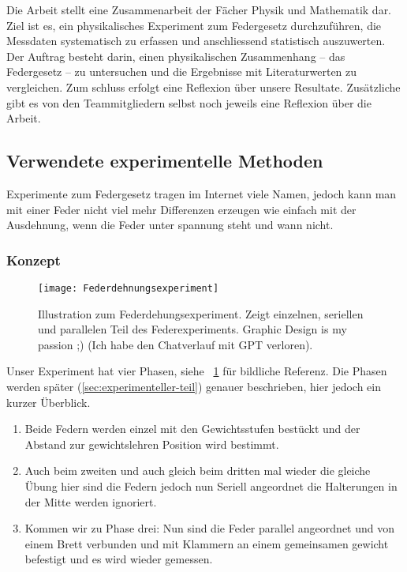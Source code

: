 \documentclass[../main.tex]{subfiles} %
\begin{document}
        Die Arbeit stellt eine Zusammenarbeit der Fächer Physik und Mathematik dar.
        Ziel ist es, ein physikalisches Experiment zum Federgesetz durchzuführen, die Messdaten systematisch zu erfassen und anschliessend statistisch auszuwerten.
        Der Auftrag besteht darin, einen physikalischen Zusammenhang – das Federgesetz – zu untersuchen und die Ergebnisse mit Literaturwerten zu vergleichen.
        Zum schluss erfolgt eine Reflexion über unsere Resultate.
        Zusätzliche gibt es von den Teammitgliedern selbst noch jeweils eine Reflexion über die Arbeit.


    \subsection{Verwendete experimentelle Methoden}\label{subsec:verwendete-experimentelle-methoden}

        Experimente zum Federgesetz tragen im Internet viele Namen, jedoch kann man mit einer Feder nicht viel mehr Differenzen
        erzeugen wie einfach mit der Ausdehnung, wenn die Feder unter spannung steht und wann nicht.

        \subsubsection{Konzept}\label{subsubsec:konzept}

            \begin{figure}[ht]
                \centering
                \texttt{[image: Federdehnungsexperiment]}
                \caption{Illustration zum Federdehungsexperiment. Zeigt einzelnen, seriellen und parallelen Teil des Federexperiments. Graphic Design is my passion ;) (Ich habe den Chatverlauf mit GPT verloren).}
                \label{fig:mesh1}
            \end{figure}

            \noindent Unser Experiment hat vier Phasen, siehe ~\ref{fig:mesh1} für bildliche Referenz.
            Die Phasen werden später (\ref{sec:experimenteller-teil}) genauer beschrieben, hier jedoch ein kurzer Überblick.
            \begin{enumerate}
                \item Beide Federn werden einzel mit den Gewichtsstufen bestückt und der Abstand zur gewichtslehren Position wird bestimmt.
                \item Auch beim zweiten und auch gleich beim dritten mal wieder die gleiche Übung hier sind die Federn jedoch nun Seriell angeordnet die Halterungen in der Mitte werden ignoriert.
                \item Kommen wir zu Phase drei: Nun sind die Feder parallel angeordnet und von einem Brett verbunden und mit Klammern an einem gemeinsamen gewicht befestigt und es wird wieder gemessen.
            \end{enumerate}
\end{document}
